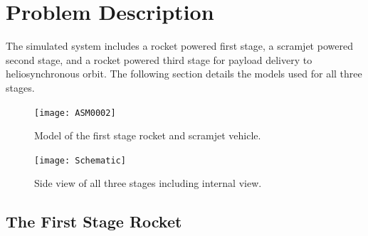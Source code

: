 \documentclass[]{aiaa-tc}
\begin{document}
\section{Problem Description} \label{section:problem}

The simulated system includes a rocket powered first stage, a scramjet powered second stage, and a rocket powered third stage for payload delivery to heliosynchronous orbit.  The following section details the models used for all three stages.

\begin{figure}[ht]
	\centering
	\texttt{[image: ASM0002]}
	\caption{Model of the first stage rocket and scramjet vehicle.}
	\label{fig:ASM0002}
\end{figure}


\begin{figure}[ht]
	\centering
	\texttt{[image: Schematic]}
	\caption{Side view of all three stages including internal view.}
	\label{fig:Schematic}
\end{figure}

\subsection{The First Stage Rocket}
\end{document}
